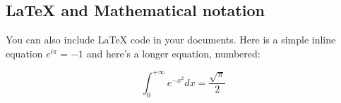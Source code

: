\subsection{LaTeX and Mathematical notation}
\label{sec:latex}
You can also include LaTeX code in your documents. Here is a simple inline equation $e^{i\pi}=-1$ and here's a longer equation, numbered:

\begin{equation}
\label{eqn:some}
\int_0^{+\infty}e^{-x^2}dx=\frac{\sqrt{\pi}}{2}
\end{equation}